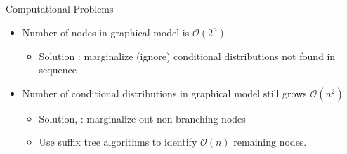 
\begin{frame}[t]{Computational Problems}
\begin{itemize}
\item Number of nodes in graphical model is $\mathcal{O}(2^n)$
\begin{itemize}
\item Solution : marginalize (ignore) conditional distributions not found in sequence
\end{itemize}
\item Number of conditional distributions in graphical model still grows $\mathcal{O}(n^2)$
\begin{itemize}
\item Solution, \citet{Wood2009} : marginalize out non-branching nodes \cite{Pitman1999, Ho2006}
\item Use suffix tree algorithms to identify  $\mathcal{O}(n)$ remaining nodes.
\end{itemize}
\end{itemize}
\end{frame}



